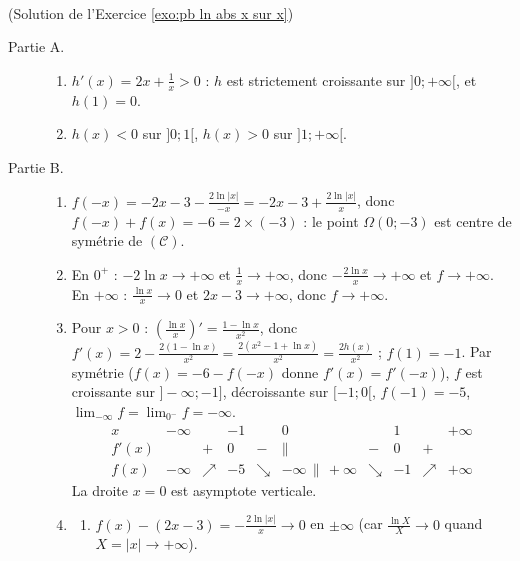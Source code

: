 \begin{corrige}
\begin{sol} ~ \\
(Solution de l'Exercice \ref{exo:pb ln abs x sur x})
\begin{description}
\item[Partie A.] \begin{enumerate}
      \item $h'(x) = 2x + \frac{1}{x} > 0$ : $h$ est strictement croissante sur $]0 ; +\infty[$, et $h(1) = 0$.
      \item $h(x) < 0$ sur $]0 ; 1[$, $h(x) > 0$ sur $]1 ; +\infty[$.
      \end{enumerate}
\item[Partie B.] \begin{enumerate}
      \item $f(-x) = -2x - 3 - \frac{2\ln|x|}{-x} = -2x - 3 + \frac{2\ln|x|}{x}$, donc $f(-x) + f(x) = -6 = 2 \times (-3)$ :
            le point $\boxed{\Omega(0 ; -3)}$ est centre de sym\'etrie de $(\mathscr{C})$.
      \item En $0^+$ : $-2\ln x \to +\infty$ et $\frac{1}{x} \to +\infty$, donc $-\frac{2\ln x}{x} \to +\infty$ et $f \to +\infty$.
            En $+\infty$ : $\frac{\ln x}{x} \to 0$ et $2x - 3 \to +\infty$, donc $f \to +\infty$.
      \item Pour $x > 0$ : $\left( \frac{\ln x}{x} \right)' = \frac{1 - \ln x}{x^2}$, donc
            $f'(x) = 2 - \frac{2(1 - \ln x)}{x^2} = \frac{2(x^2 - 1 + \ln x)}{x^2} = \frac{2h(x)}{x^2}$ ; $f(1) = -1$.
            Par sym\'etrie ($f(x) = -6 - f(-x)$ donne $f'(x) = f'(-x)$), $f$ est croissante sur $]-\infty ; -1]$, d\'ecroissante sur
            $[-1 ; 0[$, $f(-1) = -5$, $\lim_{-\infty} f = \lim_{0^-} f = -\infty$.
            \[
            \begin{array}{c|ccccccccc}
            x & -\infty & & -1 & & 0 & & 1 & & +\infty \\ \hline
            f'(x) & & + & 0 & - & \| & - & 0 & + & \\ \hline
            f(x) & -\infty & \nearrow & -5 & \searrow & -\infty \, \| \, +\infty & \searrow & -1 & \nearrow & +\infty
            \end{array}
            \]
            La droite $x = 0$ est asymptote verticale.
      \item \begin{enumerate}
            \item $f(x) - (2x - 3) = -\frac{2\ln|x|}{x} \to 0$ en $\pm\infty$ (car $\frac{\ln X}{X} \to 0$ quand $X = |x| \to +\infty$).

\end{enumerate}
\end{enumerate}
\end{description}
\end{sol}
\end{corrige}
